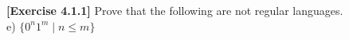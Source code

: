 \textbf{[Exercise 4.1.1]} Prove that the following are not regular languages.\\
e) $\{0^n1^m\mid n \le m\}$